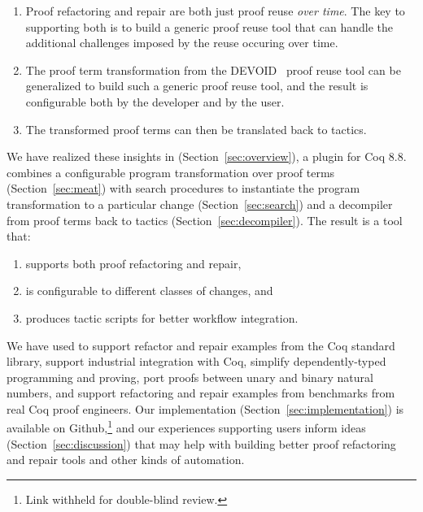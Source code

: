 \begin{enumerate}
\item Proof refactoring and repair are both just 
proof reuse %
\textit{over time}. The key to supporting both is to build a generic proof reuse
tool that can handle the additional challenges imposed by the reuse occuring over time. 
\item The proof term transformation from the \textsc{DEVOID}~\cite{Ringer2019} proof reuse tool can be generalized
to build such a generic proof reuse tool, and the result is configurable both by the developer and by the user.
\item The transformed proof terms can then be translated back to tactics.
\end{enumerate}

We have realized these insights in \toolname (Section~\ref{sec:overview}), a plugin for Coq 8.8. \toolname combines a
configurable program transformation over proof terms (Section~\ref{sec:meat}) %
with search procedures to instantiate the program transformation to a particular change (Section~\ref{sec:search})
and a decompiler from proof terms back to tactics (Section~\ref{sec:decompiler}).
The result is a tool that:

\begin{enumerate}
\item supports both proof refactoring and repair,
\item is configurable to different classes of changes, and
\item produces tactic scripts for better workflow integration.
\end{enumerate}
We have used \toolname to support refactor and repair examples from the Coq standard library,
support industrial integration with Coq,
simplify dependently-typed programming and proving,
port proofs between unary and binary natural numbers,
and support refactoring and repair examples from benchmarks from real Coq proof engineers.
Our implementation (Section~\ref{sec:implementation}) is available on Github,\footnote{Link withheld for double-blind review.}
and our experiences supporting users inform ideas (Section~\ref{sec:discussion}) that may help with building better
proof refactoring and repair tools and other kinds of automation.


